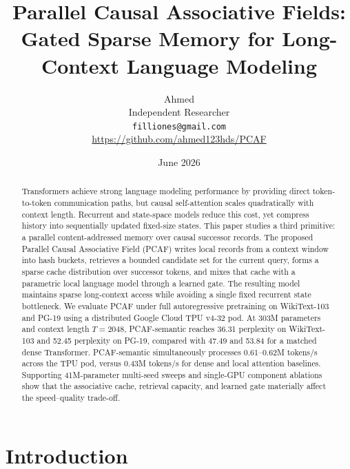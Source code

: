 \documentclass[11pt]{article}
\title{Parallel Causal Associative Fields:\\
Gated Sparse Memory for Long-Context Language Modeling}
\author{Ahmed\\
Independent Researcher\\
\texttt{filliones@gmail.com}\\
\url{https://github.com/ahmed123hds/PCAF}
}
\date{June 2026}
\begin{document}
\raggedbottom
\maketitle

\begin{abstract}
Transformers achieve strong language modeling performance by providing direct
token-to-token communication paths, but causal self-attention scales
quadratically with context length. Recurrent and state-space models reduce this
cost, yet compress history into sequentially updated fixed-size states. This
paper studies a third primitive: a parallel content-addressed memory over causal
successor records. The proposed Parallel Causal Associative Field (PCAF) writes
local records from a context window into hash buckets, retrieves a bounded
candidate set for the current query, forms a sparse cache distribution over
successor tokens, and mixes that cache with a parametric local language model
through a learned gate. The resulting model maintains sparse long-context access
while avoiding a single fixed recurrent state bottleneck.
We evaluate PCAF under full autoregressive pretraining on WikiText-103 and
PG-19 using a distributed Google Cloud TPU v4-32 pod. At 303M parameters and
context length $T{=}2048$, PCAF-semantic reaches 36.31 perplexity on
WikiText-103 and 52.45 perplexity on PG-19, compared with 47.49 and 53.84 for
a matched dense Transformer. PCAF-semantic simultaneously processes
0.61--0.62M tokens/s across the TPU pod, versus 0.43M tokens/s for dense and
local attention baselines. Supporting 41M-parameter multi-seed sweeps and
single-GPU component ablations show that the associative cache, retrieval
capacity, and learned gate materially affect the speed--quality trade-off.
\end{abstract}

\section{Introduction}
\end{document}
